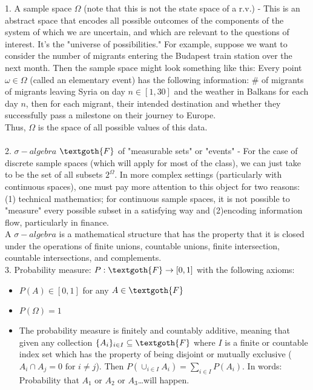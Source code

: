 \documentclass[12pt]{article}
\numberwithin{equation}{section}
\begin{document}
1. A sample space $\Omega$ (note that this is not the state space of a r.v.) - This is an abstract space that encodes all possible outcomes of the components of the system of which we are uncertain, and which are relevant to the questions of interest. It's the "universe of possibilities." For example, suppose we want to consider the number of migrants entering the Budapest train station over the next month. Then the sample space might look something like this: Every point $\omega\in\Omega$ (called an elementary event) has the following information: \# of migrants of migrants leaving Syria on day $n\in[1,30]$ and the weather in Balkans for each day $n$, then for each migrant, their intended destination and whether they successfully pass a milestone on their journey to Europe.\\
Thus, $\Omega$ is the space of all possible values of this data. \\
\\
2. $\sigma -algebra$ $\textgoth{F}$ of "measurable sets" or "events" - For the case of discrete sample spaces (which will apply for most of the class), we can just take  to be the set of all subsets $2^\Omega$. In more complex settings (particularly with continuous spaces), one must pay more attention to this object for two reasons: (1) technical mathematics; for continuous sample spaces, it is not possible to "measure" every possible subset in a satisfying way and (2)encoding information flow, particularly in finance.\\
A $\sigma-algebra$ is a mathematical structure that has the property that it is closed under the operations of finite unions, countable unions, finite intersection, countable intersections, and complements.
\\
3. Probability measure: $P:\textgoth{F}\to[0,1]$ with the following axioms:
\begin{itemize}
    \item $P(A)\in[0,1]$ for any $A\in\textgoth{F}$
    \item $P(\Omega)=1$
    \item The probability measure is finitely and countably additive, meaning that given any collection $\{A_i\}_{i\in I}\subseteq \textgoth{F}$ where $I$ is a finite or countable index set which has the property of being disjoint or mutually exclusive ($A_i\cap A_j=0\text{  for } i\neq j$). Then $P(\cup_{i\in I}A_i)=\sum_{i\in I}P(A_i)$. In words: Probability that $A_1$ or $A_2$ or $A_3$\ldots will happen.
\end{itemize}
\end{document}

